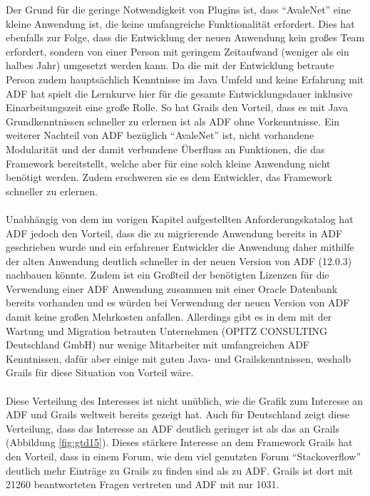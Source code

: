   Der Grund für die geringe Notwendigkeit von Plugins ist, dass "`AvaleNet"' eine kleine Anwendung ist, die keine umfangreiche Funktionalität erfordert. Dies hat ebenfalls zur Folge, dass die Entwicklung der neuen Anwendung kein großes Team erfordert, sondern von einer Person mit geringem Zeitaufwand (weniger als ein halbes Jahr) umgesetzt werden kann. Da die mit der Entwicklung betraute Person zudem hauptsächlich Kenntnisse im Java Umfeld und keine Erfahrung mit ADF hat spielt die Lernkurve hier für die gesamte Entwicklungsdauer inklusive Einarbeitungszeit eine große Rolle. So hat Grails den Vorteil, dass es mit Java Grundkenntnissen schneller zu erlernen ist als ADF ohne Vorkenntnisse. Ein weiterer Nachteil von ADF bezüglich "`AvaleNet"' ist, nicht vorhandene Modularität und der damit verbundene Überfluss an Funktionen, die das Framework bereitstellt, welche aber für eine solch kleine Anwendung nicht benötigt werden. Zudem erschweren sie es dem Entwickler, das Framework schneller zu erlernen. \\\\
  Unabhängig von dem im vorigen Kapitel aufgestellten Anforderungskatalog hat ADF jedoch den Vorteil, dass die zu migrierende Anwendung bereits in ADF geschrieben wurde und ein erfahrener Entwickler die Anwendung daher mithilfe der alten Anwendung deutlich schneller in der neuen Version von ADF (12.0.3) nachbauen könnte. Zudem ist ein Großteil der benötigten Lizenzen für die Verwendung einer ADF Anwendung zusammen mit einer Oracle Datenbank bereits vorhanden und es würden bei Verwendung der neuen Version von ADF damit keine großen Mehrkosten anfallen. Allerdings gibt es in dem mit der Wartung und Migration betrauten Unternehmen (OPITZ CONSULTING Deutschland GmbH) nur wenige Mitarbeiter mit umfangreichen ADF Kenntnissen, dafür aber einige mit guten Java- und Grailskenntnissen, weshalb Grails für diese Situation von Vorteil wäre. \\\\
  Diese Verteilung des Interesses ist nicht unüblich, wie die Grafik zum Interesse an ADF und Grails weltweit bereits gezeigt hat. Auch für Deutschland zeigt diese Verteilung, dass das Interesse an ADF deutlich geringer ist als das an Grails (Abbildung \ref{fig:gtd15}). Dieses stärkere Interesse an dem Framework Grails hat den Vorteil, dass in einem Forum, wie dem viel genutzten Forum "`Stackoverflow"' deutlich mehr Einträge zu Grails zu finden sind als zu ADF. Grails ist dort mit 21260\autocite{SOFG2015} beantworteten Fragen vertreten und ADF mit nur 1031\autocite{SOFA2015}.

